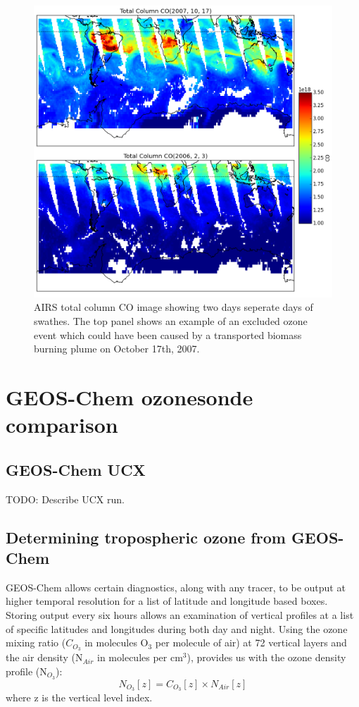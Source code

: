     \begin{figure}[!htbp]
      \includegraphics[width=\textwidth]{Figures/Ozone/AIRS_compare.png}
      \caption{AIRS total column CO image showing two days seperate days of swathes. The top panel shows an example of an excluded ozone event which could have been caused by a transported biomass burning plume on October 17th, 2007.}
      \label{ch_o3:fig:excludedeg}
    \end{figure}

  
\section{GEOS-Chem ozonesonde comparison}
  
  \subsection{GEOS-Chem UCX}
    TODO: Describe UCX run.
    
  \subsection{Determining tropospheric ozone from GEOS-Chem}
    GEOS-Chem allows certain diagnostics, along with any tracer, to be output at higher temporal resolution for a list of latitude and longitude based boxes.
    Storing output every six hours allows an examination of vertical profiles at a list of specific latitudes and longitudes during both day and night.
    Using the ozone mixing ratio ($C_{O_3}$ in molecules O$_3$ per molecule of air) at 72 vertical layers and the air density (N$_{Air}$ in molecules per cm$^3$), provides us with the ozone density profile (N$_{O_3}$):
    \begin{equation*}
     N_{O_3}[z] = C_{O_3}[z] \times N_{Air}[z]
    \end{equation*}
    where z is the vertical level index.
    
